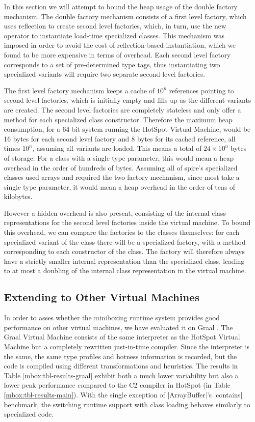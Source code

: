 In this section we will attempt to bound the heap usage of the double factory mechanism. The double factory mechanism consists of a first level factory, which uses reflection to create second level factories, which, in turn, use the new operator to instantiate load-time specialized classes. This mechanism was imposed in order to avoid the cost of reflection-based instantiation, which we found to be more expensive in terms of overhead. Each second level factory corresponds to a set of pre-determined type tags, thus instantiating two specialized variants will require two separate second level factories.

The first level factory mechanism keeps a cache of $10^n$ references pointing to second level factories, which is initially empty and fills up as the different variants are created. The second level factories are completely stateless and only offer a method for each specialized class constructor. Therefore the maximum heap consumption, for a 64 bit system running the HotSpot Virtual Machine, would be 16 bytes for each second level factory and 8 bytes for its cached reference, all times $10^n$, assuming all variants are loaded. This means a total of $24 \times 10^n$ bytes of storage. For a class with a single type parameter, this would mean a heap overhead in the order of hundreds of bytes. Assuming all of spire's specialized classes used arrays and required the two factory mechanism, since most take a single type parameter, it would mean a heap overhead in the order of tens of kilobytes.

However a hidden overhead is also present, consisting of the internal class representations for the second level factories inside the virtual machine. To bound this overhead, we can compare the factories to the classes themselves: for each specialized variant of the class there will be a specialized factory, with a method corresponding to each constructor of the class. The factory will therefore always have a strictly smaller internal representation than the specialized class, leading to at most a doubling of the internal class representation in the virtual machine.

\subsection{Extending to Other Virtual Machines}
\label{mbox:subsec-eval-other-vms}

In order to asses whether the miniboxing runtime system provides good performance on other virtual machines, we have evaluated it on Graal \cite{graal}. The Graal Virtual Machine consists of the same interpreter as the HotSpot Virtual Machine but a completely rewritten just-in-time compiler. Since the interpreter is the same, the same type profiles and hotness information is recorded, but the code is compiled using different transformations and heuristics. The results in Table \ref{mbox:tbl-results-graal} exhibit both a much lower variability but also a lower peak performance compared to the C2 compiler in HotSpot (in Table \ref{mbox:tbl-results-main}). With the single exception of |ArrayBuffer|'s |contains| benchmark, the switching runtime support with class loading behaves similarly to specialized code.        

